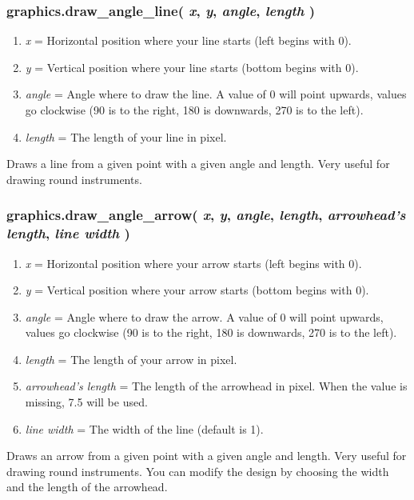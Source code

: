 \documentclass[11pt,parskip=half,a4paper]{scrartcl}
\begin{document}
\subsubsection{graphics.draw\_angle\_line( \emph{x}, \emph{y}, \emph{angle}, \emph{length} )}

\begin{enumerate}
	\item \emph{x} = Horizontal position where your line starts (left begins with 0).
	\item \emph{y} = Vertical position where your line starts (bottom begins with 0).
	\item \emph{angle} = Angle where to draw the line. A value of 0 will point upwards, values go clockwise (90 is to the right, 180 is downwards, 270 is to the left).
	\item \emph{length} = The length of your line in pixel.

\end{enumerate}

Draws a line from a given point with a given angle and length. Very useful for drawing round instruments.

\subsubsection{graphics.draw\_angle\_arrow( \emph{x}, \emph{y}, \emph{angle}, \emph{length}, \emph{arrowhead's length}, \emph{line width} )}

\begin{enumerate}
	\item \emph{x} = Horizontal position where your arrow starts (left begins with 0).
	\item \emph{y} = Vertical position where your arrow starts (bottom begins with 0).
	\item \emph{angle} = Angle where to draw the arrow. A value of 0 will point upwards, values go clockwise (90 is to the right, 180 is downwards, 270 is to the left).
	\item \emph{length} = The length of your arrow in pixel.
	\item \emph{arrowhead's length} = The length of the arrowhead in pixel. When the value is missing, 7.5 will be used.
	\item \emph{line width} = The width of the line (default is 1).
\end{enumerate}

Draws an arrow from a given point with a given angle and length. Very useful for drawing round instruments. You can modify the design by choosing the width and the length of the arrowhead.
\end{document}
